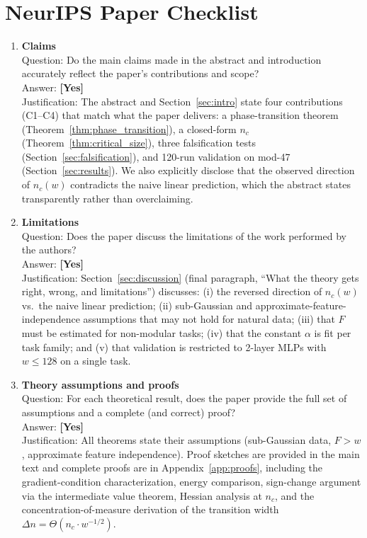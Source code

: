 \documentclass{article}
\newcommand{\nc}{n_c}
\newcommand{\Fnum}{F}
\begin{document}
\section*{NeurIPS Paper Checklist}

\begin{enumerate}

\item {\bf Claims}\\
Question: Do the main claims made in the abstract and introduction accurately reflect the paper's contributions and scope?\\
Answer: \textbf{[Yes]}\\
Justification: The abstract and Section~\ref{sec:intro} state four contributions (C1--C4) that match what the paper delivers: a phase-transition theorem (Theorem~\ref{thm:phase_transition}), a closed-form $\nc$ (Theorem~\ref{thm:critical_size}), three falsification tests (Section~\ref{sec:falsification}), and 120-run validation on mod-47 (Section~\ref{sec:results}). We also explicitly disclose that the observed direction of $\nc(w)$ contradicts the naive linear prediction, which the abstract states transparently rather than overclaiming.

\item {\bf Limitations}\\
Question: Does the paper discuss the limitations of the work performed by the authors?\\
Answer: \textbf{[Yes]}\\
Justification: Section~\ref{sec:discussion} (final paragraph, ``What the theory gets right, wrong, and limitations'') discusses: (i) the reversed direction of $\nc(w)$ vs.\ the naive linear prediction; (ii) sub-Gaussian and approximate-feature-independence assumptions that may not hold for natural data; (iii) that $\Fnum$ must be estimated for non-modular tasks; (iv) that the constant $\alpha$ is fit per task family; and (v) that validation is restricted to 2-layer MLPs with $w \le 128$ on a single task.

\item {\bf Theory assumptions and proofs}\\
Question: For each theoretical result, does the paper provide the full set of assumptions and a complete (and correct) proof?\\
Answer: \textbf{[Yes]}\\
Justification: All theorems state their assumptions (sub-Gaussian data, $\Fnum > w$, approximate feature independence). Proof sketches are provided in the main text and complete proofs are in Appendix~\ref{app:proofs}, including the gradient-condition characterization, energy comparison, sign-change argument via the intermediate value theorem, Hessian analysis at $\nc$, and the concentration-of-measure derivation of the transition width $\Delta n = \Theta(\nc \cdot w^{-1/2})$.


\end{enumerate}
\end{document}
